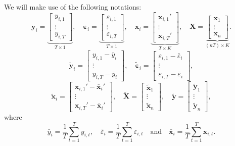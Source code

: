 \documentclass[
  11pt,
]{book}
\theoremstyle{definition}
\theoremstyle{definition}
\theoremstyle{definition}
\theoremstyle{definition}
\theoremstyle{remark}
\begin{document}
We will make use of the following notations:
\[
\mathbf{y}_i =
\underbrace{\left[
\begin{array}{c}
y_{i,1}\\
\vdots\\
y_{i,T}
\end{array}\right]}_{T \times 1}, \quad
\boldsymbol\varepsilon_i =
\underbrace{\left[
\begin{array}{c}
\varepsilon_{i,1}\\
\vdots\\
\varepsilon_{i,T}
\end{array}\right]}_{T \times 1}, \quad
\mathbf{x}_i =
\underbrace{\left[
\begin{array}{c}
\mathbf{x}_{i,1}'\\
\vdots\\
\mathbf{x}_{i,T}'
\end{array}\right]}_{T \times K}, \quad
\mathbf{X} =
\underbrace{\left[
\begin{array}{c}
\mathbf{x}_{1}\\
\vdots\\
\mathbf{x}_{n}
\end{array}\right]}_{(nT) \times K}.
\]
\[
\tilde{\mathbf{y}}_i =
\left[
\begin{array}{c}
y_{i,1} - \bar{y}_i\\
\vdots\\
y_{i,T} - \bar{y}_i
\end{array}\right], \quad
\tilde{\boldsymbol\varepsilon}_i =
\left[
\begin{array}{c}
\varepsilon_{i,1} - \bar{\varepsilon}_i\\
\vdots\\
\varepsilon_{i,T} - \bar{\varepsilon}_i
\end{array}\right],
\]
\[
\tilde{\mathbf{x}}_i =
\left[
\begin{array}{c}
\mathbf{x}_{i,1}' - \bar{\mathbf{x}}_i'\\
\vdots\\
\mathbf{x}_{i,T}' - \bar{\mathbf{x}}_i'
\end{array}\right], \quad
\tilde{\mathbf{X}} =
\left[
\begin{array}{c}
\tilde{\mathbf{x}}_{1}\\
\vdots\\
\tilde{\mathbf{x}}_{n}
\end{array}\right], \quad
\tilde{\mathbf{y}} =
\left[
\begin{array}{c}
\tilde{\mathbf{y}}_{1}\\
\vdots\\
\tilde{\mathbf{y}}_{n}
\end{array}\right],
\]
where
\[
\bar{y}_i = \frac{1}{T} \sum_{t=1}^T y_{i,t}, \quad \bar{\varepsilon}_i = \frac{1}{T}\sum_{t=1}^T \varepsilon_{i,t} \quad \mbox{and} \quad \bar{\mathbf{x}}_i = \frac{1}{T}\sum_{t=1}^T \mathbf{x}_{i,t}.
\]
\end{document}
